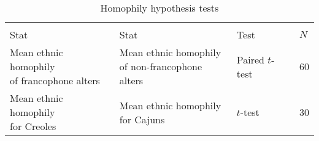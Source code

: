     \begin{table}[tbhp]
      \centering
      \caption{Homophily hypothesis tests}
      \label{tab:homophily}
      \begin{tabular}{l l l l}
                                                    &                                                 &                 & \\
        Stat                                        & Stat                                            & Test            & $N$ \\
        \hline
        \pbox{\textwidth}{Mean ethnic homophily\\of francophone alters} & \pbox{\textwidth}{Mean ethnic homophily\\of non-francophone alters} & Paired $t$-test & 60 \\
        \hline
        \pbox{\textwidth}{Mean ethnic homophily\\for Creoles}           & \pbox{\textwidth}{Mean ethnic homophily\\for Cajuns}             & $t$-test        & 30 \\
      \end{tabular}
    \end{table}
